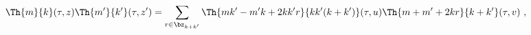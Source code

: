 \begin{equation}
 \Th{m}{k}(\tau,z)\Th{m'}{k'}(\tau,z')
 =\sum_{r\in\bz_{k+k'}}\Th{mk'-m'k+2kk'r}{kk'(k+k')}(\tau,u)
 \Th{m+m'+2kr}{k+k'}(\tau,v)~,
 \label{product}
 \end{equation} 
